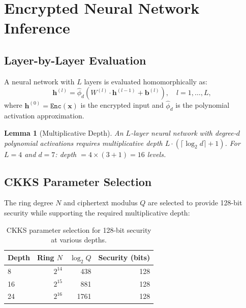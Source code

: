 \documentclass[11pt]{article}
\newtheorem{lemma}[theorem]{Lemma}
\begin{document}
\section{Encrypted Neural Network Inference}
\label{sec:nn}

\subsection{Layer-by-Layer Evaluation}

A neural network with $L$ layers is evaluated homomorphically as:
\begin{equation}
\mathbf{h}^{(l)} = \hat{\phi}_d\!\left(W^{(l)} \cdot \mathbf{h}^{(l-1)} +
\mathbf{b}^{(l)}\right), \quad l = 1, \ldots, L,
\end{equation}
where $\mathbf{h}^{(0)} = \texttt{Enc}(\mathbf{x})$ is the encrypted input
and $\hat{\phi}_d$ is the polynomial activation approximation.

\begin{lemma}[Multiplicative Depth]
An $L$-layer neural network with degree-$d$ polynomial activations requires
multiplicative depth $L \cdot (\lceil\log_2 d\rceil + 1)$. For $L = 4$ and
$d = 7$: depth $= 4 \times (3 + 1) = 16$ levels.
\end{lemma}

\subsection{CKKS Parameter Selection}

The ring degree $N$ and ciphertext modulus $Q$ are selected to provide 128-bit
security while supporting the required multiplicative depth:

\begin{table}[H]
\centering
\small
\begin{tabular}{lrrr}
\toprule
\textbf{Depth} & \textbf{Ring $N$} & \textbf{$\log_2 Q$} & \textbf{Security (bits)} \\
\midrule
8 & $2^{14}$ & 438 & 128 \\
16 & $2^{15}$ & 881 & 128 \\
24 & $2^{16}$ & 1761 & 128 \\
\bottomrule
\end{tabular}
\caption{CKKS parameter selection for 128-bit security at various depths.}
\label{tab:params}
\end{table}
\end{document}
